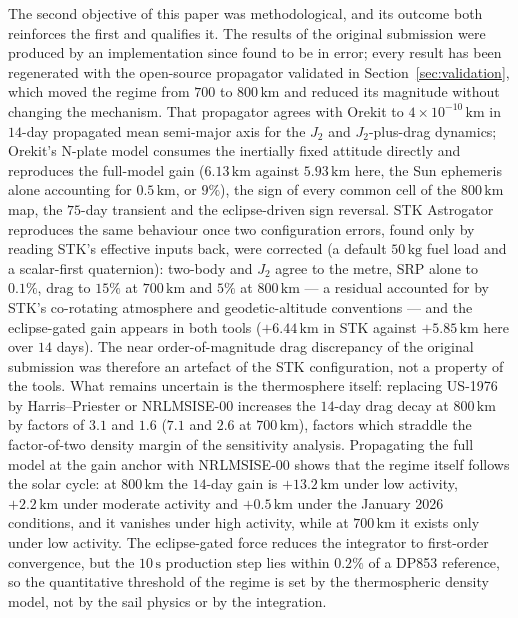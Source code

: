 \vspace{5pt}
\par\noindent The second objective of this paper was methodological, and its outcome both reinforces the first and qualifies it. The results of the original submission were produced by an implementation since found to be in error; every result has been regenerated with the open-source propagator validated in Section~\ref{sec:validation}, which moved the regime from \(700\) to \(800\,\mathrm{km}\) and reduced its magnitude without changing the mechanism. That propagator agrees with Orekit to \(4\times10^{-10}\,\mathrm{km}\) in \(14\)-day propagated mean semi-major axis for the \(J_2\) and \(J_2\)-plus-drag dynamics; Orekit's N-plate model consumes the inertially fixed attitude directly and reproduces the full-model gain (\(6.13\,\mathrm{km}\) against \(5.93\,\mathrm{km}\) here, the Sun ephemeris alone accounting for \(0.5\,\mathrm{km}\), or \(9\%\)), the sign of every common cell of the \(800\,\mathrm{km}\) map, the \(75\)-day transient and the eclipse-driven sign reversal. STK Astrogator reproduces the same behaviour once two configuration errors, found only by reading STK's effective inputs back, were corrected (a default \(50\,\mathrm{kg}\) fuel load and a scalar-first quaternion): two-body and \(J_2\) agree to the metre, SRP alone to \(0.1\%\), drag to \(15\%\) at \(700\,\mathrm{km}\) and \(5\%\) at \(800\,\mathrm{km}\) --- a residual accounted for by STK's co-rotating atmosphere and geodetic-altitude conventions --- and the eclipse-gated gain appears in both tools (\(+6.44\,\mathrm{km}\) in STK against \(+5.85\,\mathrm{km}\) here over \(14\) days). The near order-of-magnitude drag discrepancy of the original submission was therefore an artefact of the STK configuration, not a property of the tools. What remains uncertain is the thermosphere itself: replacing US-1976 by Harris--Priester or NRLMSISE-00 increases the \(14\)-day drag decay at \(800\,\mathrm{km}\) by factors of \(3.1\) and \(1.6\) (\(7.1\) and \(2.6\) at \(700\,\mathrm{km}\)), factors which straddle the factor-of-two density margin of the sensitivity analysis. Propagating the full model at the gain anchor with NRLMSISE-00 shows that the regime itself follows the solar cycle: at \(800\,\mathrm{km}\) the \(14\)-day gain is \(+13.2\,\mathrm{km}\) under low activity, \(+2.2\,\mathrm{km}\) under moderate activity and \(+0.5\,\mathrm{km}\) under the January 2026 conditions, and it vanishes under high activity, while at \(700\,\mathrm{km}\) it exists only under low activity. The eclipse-gated force reduces the integrator to first-order convergence, but the \(10\,\mathrm{s}\) production step lies within \(0.2\%\) of a DP853 reference, so the quantitative threshold of the regime is set by the thermospheric density model, not by the sail physics or by the integration.

